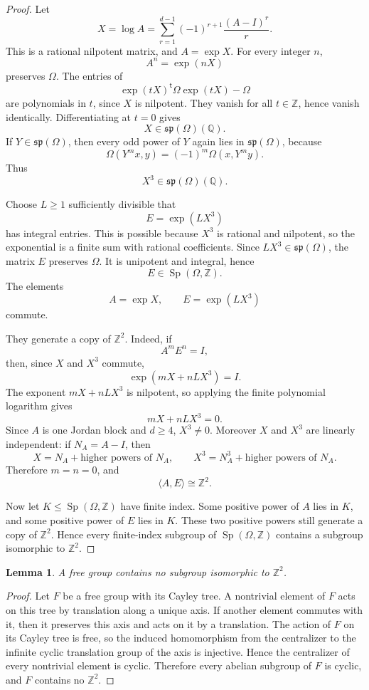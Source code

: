 \documentclass[a4paper,11pt]{amsart}
\newtheorem{lemma}[theorem]{Lemma}
\theoremstyle{remark}
\newcommand{\Z}{\mathbb Z}
\newcommand{\Q}{\mathbb Q}
\DeclareMathOperator{\Sp}{Sp}
\numberwithin{equation}{section}
\begin{document}
\begin{proof}
Let
\[
        X=\log A
        =
        \sum_{r=1}^{d-1}(-1)^{r+1}\frac{(A-I)^r}{r}.
\]
This is a rational nilpotent matrix, and \(A=\exp X\).  For every integer \(n\),
\[
        A^n=\exp(nX)
\]
preserves \(\Omega\).  The entries of
\[
        \exp(tX)^{\mathsf t}\Omega\exp(tX)-\Omega
\]
are polynomials in \(t\), since \(X\) is nilpotent.  They vanish for all \(t\in\Z\), hence vanish identically.  Differentiating at \(t=0\) gives
\[
        X\in\mathfrak{sp}(\Omega)(\Q).
\]
If \(Y\in\mathfrak{sp}(\Omega)\), then every odd power of \(Y\) again lies in \(\mathfrak{sp}(\Omega)\), because
\[
        \Omega(Y^m x,y)=(-1)^m\Omega(x,Y^m y).
\]
Thus
\[
        X^3\in\mathfrak{sp}(\Omega)(\Q).
\]

Choose \(L\ge1\) sufficiently divisible that
\[
        E=\exp(LX^3)
\]
has integral entries.  This is possible because \(X^3\) is rational and nilpotent, so the exponential is a finite sum with rational coefficients.  Since \(LX^3\in\mathfrak{sp}(\Omega)\), the matrix \(E\) preserves \(\Omega\).  It is unipotent and integral, hence
\[
        E\in\Sp(\Omega,\Z).
\]
The elements
\[
        A=\exp X,
        \qquad
        E=\exp(LX^3)
\]
commute.

They generate a copy of \(\Z^2\).  Indeed, if
\[
        A^mE^n=I,
\]
then, since \(X\) and \(X^3\) commute,
\[
        \exp(mX+nLX^3)=I.
\]
The exponent \(mX+nLX^3\) is nilpotent, so applying the finite polynomial logarithm gives
\[
        mX+nLX^3=0.
\]
Since \(A\) is one Jordan block and \(d\ge4\), \(X^3\ne0\).  Moreover \(X\) and \(X^3\) are linearly independent: if \(N_A=A-I\), then
\[
        X=N_A+\text{higher powers of }N_A,
        \qquad
        X^3=N_A^3+\text{higher powers of }N_A.
\]
Therefore \(m=n=0\), and
\[
        \langle A,E\rangle\cong\Z^2.
\]

Now let \(K\le\Sp(\Omega,\Z)\) have finite index.  Some positive power of \(A\) lies in \(K\), and some positive power of \(E\) lies in \(K\).  These two positive powers still generate a copy of \(\Z^2\).  Hence every finite-index subgroup of \(\Sp(\Omega,\Z)\) contains a subgroup isomorphic to \(\Z^2\).
\end{proof}

\begin{lemma}\label{lem:free-no-Z2}
A free group contains no subgroup isomorphic to \(\Z^2\).
\end{lemma}

\begin{proof}
Let \(F\) be a free group with its Cayley tree.  A nontrivial element of \(F\) acts on this tree by translation along a unique axis.  If another element commutes with it, then it preserves this axis and acts on it by a translation.  The action of \(F\) on its Cayley tree is free, so the induced homomorphism from the centralizer to the infinite cyclic translation group of the axis is injective.  Hence the centralizer of every nontrivial element is cyclic.  Therefore every abelian subgroup of \(F\) is cyclic, and \(F\) contains no \(\Z^2\).
\end{proof}
\end{document}
